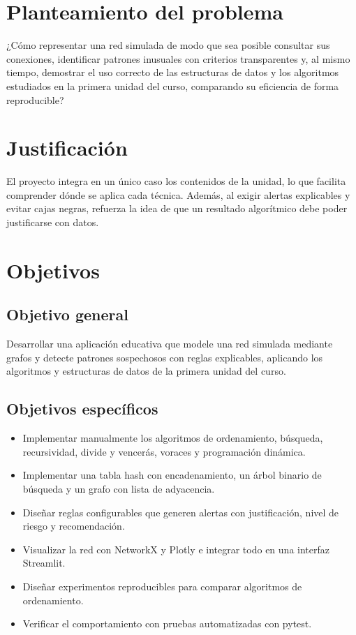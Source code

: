 \documentclass[12pt,a4paper]{article}
\begin{document}
\section{Planteamiento del problema}
¿Cómo representar una red simulada de modo que sea posible consultar sus conexiones, identificar patrones inusuales con criterios transparentes y, al mismo tiempo, demostrar el uso correcto de las estructuras de datos y los algoritmos estudiados en la primera unidad del curso, comparando su eficiencia de forma reproducible?

\section{Justificación}
El proyecto integra en un único caso los contenidos de la unidad, lo que facilita comprender dónde se aplica cada técnica. Además, al exigir alertas explicables y evitar cajas negras, refuerza la idea de que un resultado algorítmico debe poder justificarse con datos.

\section{Objetivos}
\subsection{Objetivo general}
Desarrollar una aplicación educativa que modele una red simulada mediante grafos y detecte patrones sospechosos con reglas explicables, aplicando los algoritmos y estructuras de datos de la primera unidad del curso.

\subsection{Objetivos específicos}
\begin{itemize}
  \item Implementar manualmente los algoritmos de ordenamiento, búsqueda, recursividad, divide y vencerás, voraces y programación dinámica.
  \item Implementar una tabla hash con encadenamiento, un árbol binario de búsqueda y un grafo con lista de adyacencia.
  \item Diseñar reglas configurables que generen alertas con justificación, nivel de riesgo y recomendación.
  \item Visualizar la red con NetworkX y Plotly e integrar todo en una interfaz Streamlit.
  \item Diseñar experimentos reproducibles para comparar algoritmos de ordenamiento.
  \item Verificar el comportamiento con pruebas automatizadas con pytest.
\end{itemize}
\end{document}
